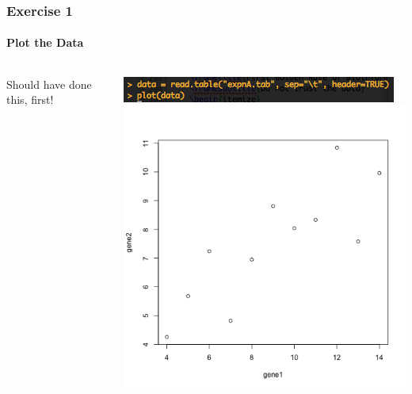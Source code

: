 \documentclass[table]{beamer}
\begin{document}
  \begin{frame}
    \frametitle{Exercise 1}
    \framesubtitle{Plot the Data}
    \begin{center}
    \begin{columns}[t]
	  \begin{column}{5cm}
	   Should have done this, first!
	  \end{column}
  	  \begin{column}{5cm}
        \includegraphics[width=\textwidth]{images/ex1_screenshot_c} \\
        \includegraphics[width=\textwidth]{images/ex1_screenshot_d}        
      \end{column}
    \end{columns}
    \end{center}
  \end{frame}
\end{document}
